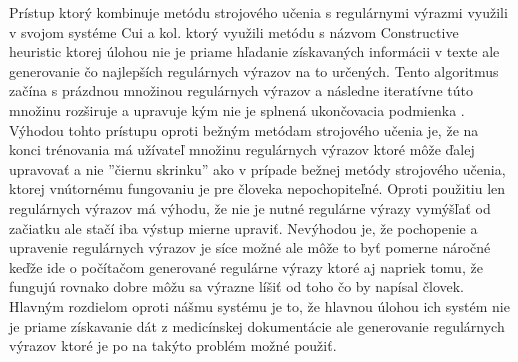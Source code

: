 Prístup ktorý kombinuje metódu strojového učenia 
s regulárnymi výrazmi využili v svojom systéme
Cui a kol. \cite{CHA} ktorý využili metódu s názvom 
Constructive heuristic ktorej úlohou nie je
priame hľadanie získavaných informácii v texte ale
generovanie čo najlepších regulárnych výrazov
na to určených. Tento algoritmus začína s
prázdnou množinou regulárnych výrazov a 
následne iteratívne túto množinu rozširuje
a upravuje kým nie je splnená ukončovacia
podmienka \cite{conHeu}. Výhodou tohto prístupu oproti
bežným metódam strojového učenia je, 
že na konci trénovania má užívateľ množinu
regulárnych výrazov ktoré môže ďalej upravovať
a nie ''čiernu skrinku'' ako v prípade bežnej metódy strojového
učenia, ktorej vnútornému fungovaniu je pre človeka
nepochopiteľné. Oproti použitiu len regulárnych výrazov
má výhodu, že nie je nutné regulárne výrazy vymýšľať
od začiatku ale stačí iba výstup mierne upraviť.
Nevýhodou je, že pochopenie a upravenie regulárnych
výrazov je síce možné ale môže to byť pomerne náročné
keďže ide o počítačom generované regulárne výrazy
ktoré aj napriek tomu, že fungujú rovnako dobre môžu
sa výrazne líšiť od toho čo by napísal človek.  
Hlavným rozdielom oproti nášmu systému je to, 
že hlavnou úlohou ich systém nie je priame získavanie
dát z medicínskej dokumentácie ale generovanie 
regulárnych výrazov ktoré je po na takýto problém
možné použiť.

